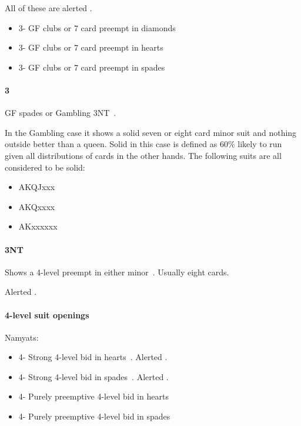 All of these are alerted .

\begin{itemize}
\item 3\clubs - GF clubs or 7 card preempt in diamonds 
\item 3\diamonds - GF clubs or 7 card preempt in hearts 
\item 3\hearts - GF clubs or 7 card preempt in spades 
\end{itemize}

\paragraph{3\spades}

GF spades or Gambling 3NT~. 

In the Gambling case it shows a solid seven or eight card minor suit and nothing outside better than a
queen.  Solid in this case is defined as 60\% likely to run given all
distributions of cards in the other hands. The following suits are all
considered to be solid:

\begin{itemize}
\item AKQJxxx
\item AKQxxxx
\item AKxxxxxx
\end{itemize}

\paragraph{3NT}

Shows a 4-level preempt in either minor~. Usually eight cards. 

Alerted .

\paragraph{4-level suit openings}

Namyats:

\begin{itemize}
\item 4\clubs - Strong 4-level bid in hearts~. Alerted .
\item 4\diamonds - Strong 4-level bid in spades~. Alerted .
\item 4\hearts - Purely preemptive 4-level bid in hearts
\item 4\spades - Purely preemptive 4-level bid in spades
\end{itemize}

